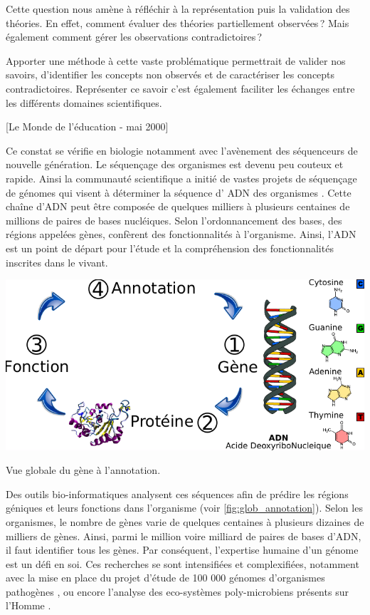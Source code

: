 \begin{refsegment}
Cette question nous amène à réfléchir à la représentation puis la validation des théories. En effet, comment évaluer des théories partiellement observées ? Mais également comment gérer les observations contradictoires ?

Apporter une méthode à cette vaste problématique permettrait de valider nos savoirs, d'identifier les concepts non observés et de caractériser les concepts contradictoires. Représenter ce savoir c'est également faciliter les échanges entre les différents domaines scientifiques.

[Le Monde de l'éducation - mai 2000]

Ce constat se vérifie en biologie notamment avec l'avènement des séquenceurs de nouvelle génération. Le séquençage des organismes est devenu peu couteux et rapide. Ainsi la communauté scientifique a initié de vastes projets de séquençage de génomes qui visent à déterminer la séquence d' \gls{ADN} des organismes . Cette chaîne d'\gls{ADN} peut être composée de quelques milliers à plusieurs centaines de millions de paires de bases nucléiques. Selon l'ordonnancement des bases, des régions appelées gènes, confèrent des fonctionnalités à l'organisme. Ainsi, l'\gls{ADN} est un point de départ pour l'étude et la compréhension des fonctionnalités inscrites dans le vivant.


\begin{shadedfigure}
    \centering
    \includegraphics{img/simple_annotation_process.pdf}
    \caption{Vue globale du gène à l'annotation.}
    \label{fig:glob_annotation}
\end{shadedfigure}

Des outils bio-informatiques analysent ces séquences afin de prédire les régions géniques et leurs fonctions dans l'organisme (voir \cref{fig:glob_annotation}). Selon les organismes, le nombre de gènes varie de quelques centaines à plusieurs dizaines de milliers de gènes. Ainsi, parmi le million voire milliard de paires de bases d'\gls{ADN}, il faut identifier tous les gènes. Par conséquent, l'expertise humaine d'un génome est un défi en soi. Ces recherches se sont intensifiées et complexifiées, notamment avec la mise en place du projet d'étude de 100 000 génomes d'organismes pathogènes \cite{100kfoodborne}, ou encore l'analyse des eco-systèmes poly-microbiens présents sur l'Homme \cite{hmp}.


\end{refsegment}
